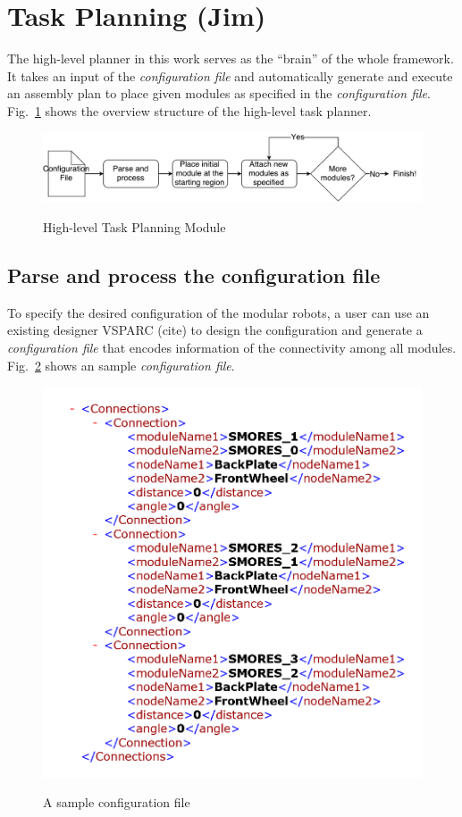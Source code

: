 \section{Task Planning (Jim)}

The high-level planner in this work serves as the ``brain'' of the whole framework.
It takes an input of the {\it configuration file} and automatically generate and execute an assembly plan to place given modules as specified in the {\it configuration file}.
Fig.~\ref{fig:taskplan} shows the overview structure of the high-level task planner.

\begin{figure}[ht!]%
\centering
{\includegraphics[width=0.95\columnwidth]{pics/highlevelflow.pdf}}
\caption{High-level Task Planning Module}
\label{fig:taskplan}
\end{figure}

\subsection{Parse and process the configuration file}
To specify the desired configuration of the modular robots, a user can use an existing designer VSPARC ({\color{red}cite}) to design the configuration and generate a {\it configuration file} that encodes information of the connectivity among all modules.
Fig.~\ref{fig:configfile} shows an sample {\it configuration file}.

\begin{figure}[ht!]%
\centering
{\includegraphics[width=0.95\columnwidth]{pics/configfile.png}}
\caption{A sample configuration file}
\label{fig:configfile}
\end{figure}

